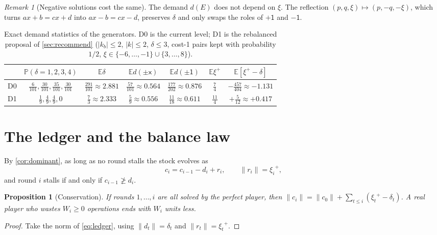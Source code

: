\documentclass[11pt,a4paper]{article}
\newtheorem{proposition}[theorem]{Proposition}
\theoremstyle{definition}
\theoremstyle{remark}
\newtheorem{remark}[theorem]{Remark}
\newcommand{\E}{\mathbb{E}}
\renewcommand{\P}{\mathbb{P}}
\newcommand{\pU}{\ensuremath{\mathord{+}\mathsf{1}}}
\newcommand{\mU}{\ensuremath{\mathord{-}\mathsf{1}}}
\newcommand{\abs}[1]{\lvert #1\rvert}
\newcommand{\norm}[1]{\lVert #1\rVert}
\newcommand{\pos}[1]{{#1}^{+}}
\begin{document}
\begin{remark}[Negative solutions cost the same]\label{rem:symmetry}
The demand $d(E)$ does not depend on $\xi$. The reflection
$(p,q,\xi)\mapsto(p,-q,-\xi)$, which turns $ax+b=cx+d$ into $ax-b=cx-d$, preserves
$\delta$ and only swaps the roles of $\pU$ and $\mU$.
\end{remark}

\begin{table}[t]\centering\small
\caption{Exact demand statistics of the generators.
D0 is the current level; D1 is the rebalanced proposal of \cref{sec:recommend}
($\abs{k_b}\le2$, $\abs k\le 2$, $\delta\le3$, cost-1 pairs kept with probability $1/2$,
$\xi\in\{-6,\dots,-1\}\cup\{3,\dots,8\}$).}\label{tab:demand}
\begin{tabular}{lcccccc}
\toprule
 & $\P(\delta{=}1,2,3,4)$ & $\E\delta$ & $\E d(\pm\mathsf x)$ & $\E d(\pm\mathsf 1)$ & $\E\pos\xi$ & $\E[\pos\xi-\delta]$\\
\midrule
D0 & $\tfrac{6}{101},\tfrac{30}{101},\tfrac{35}{101},\tfrac{30}{101}$ & $\tfrac{291}{101}\approx2.881$ & $\tfrac{57}{101}\approx0.564$ & $\tfrac{177}{202}\approx0.876$ & $\tfrac74$ & $-\tfrac{457}{404}\approx-1.131$\\[2pt]
D1 & $\tfrac19,\tfrac49,\tfrac49,0$ & $\tfrac73\approx2.333$ & $\tfrac59\approx0.556$ & $\tfrac{11}{18}\approx0.611$ & $\tfrac{11}4$ & $+\tfrac5{12}\approx+0.417$\\
\bottomrule
\end{tabular}
\end{table}

\section{The ledger and the balance law}\label{sec:ledger}

By \cref{cor:dominant}, as long as no round stalls the stock evolves as
\begin{equation}\label{eq:ledger}
c_i=c_{i-1}-d_i+r_i,\qquad \norm{r_i}=\pos{\xi_i},
\end{equation}
and round $i$ stalls if and only if $c_{i-1}\not\ge d_i$.

\begin{proposition}[Conservation]\label{prop:conservation}
If rounds $1,\dots,i$ are all solved by the perfect player, then
$\norm{c_i}=\norm{c_0}+\sum_{t\le i}(\pos{\xi_t}-\delta_t)$. A real player who wastes
$W_i\ge0$ operations ends with $W_i$ units less.
\end{proposition}
\begin{proof}
Take the norm of \eqref{eq:ledger}, using $\norm{d_t}=\delta_t$ and $\norm{r_t}=\pos{\xi_t}$.
\end{proof}
\end{document}
